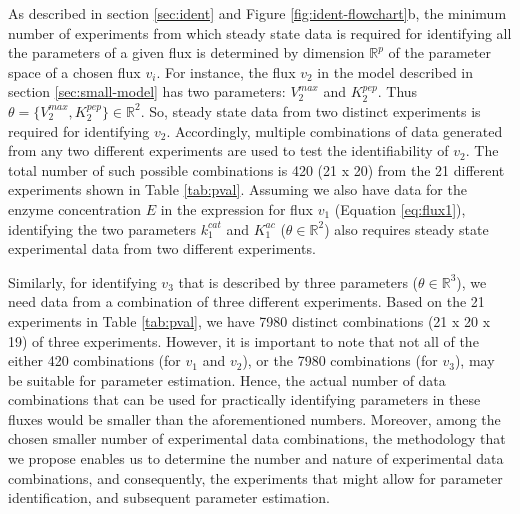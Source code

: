 \documentclass[10pt]{article}
\begin{document}
As described in section \ref{sec:ident} and Figure \ref{fig:ident-flowchart}b, the minimum number of experiments from which steady state data is required for identifying all the parameters of a given flux is determined by dimension $\mathbb{R}^p$ of the parameter space of a chosen flux $v_i$. For instance, the flux $v_2$ in the model described in section \ref{sec:small-model} has two parameters: $V_2^{max}$ and $K_2^{pep}$. Thus $\theta = \{V_2^{max}, K_2^{pep}\} \in \mathbb{R}^2$. So, steady state data from two distinct experiments is required for identifying $v_2$. Accordingly, multiple combinations of data generated from any two different experiments are used to test the identifiability of $v_2$. The total number of such possible combinations is 420 (21 x 20) from the 21 different experiments shown in Table \ref{tab:pval}. Assuming we also have data for the enzyme concentration $E$ in the expression for flux $v_1$ (Equation \ref{eq:flux1}), identifying the two parameters $k_1^{cat}$ and $K_1^{ac}$ ($\theta \in \mathbb{R}^2$) also requires steady state experimental data from two different experiments.

Similarly, for identifying $v_3$ that is described by three parameters ($\theta \in \mathbb{R}^3$), we need data from a combination of three different experiments. Based on the 21 experiments in Table \ref{tab:pval}, we have 7980 distinct combinations (21 x 20 x 19) of three experiments. However, it is important to note that not all of the either 420 combinations (for $v_1$ and $v_2$), or the 7980 combinations (for $v_3$), may be suitable for parameter estimation. Hence, the actual number of data combinations that can be used for practically identifying parameters in these fluxes would be smaller than the aforementioned numbers. Moreover, among the chosen smaller number of experimental data combinations, the methodology that we propose enables us to determine the number and nature of experimental data combinations, and consequently, the experiments that might allow for parameter identification, and subsequent parameter estimation.
\end{document}
